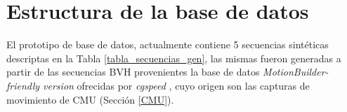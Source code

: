 \section{Estructura de la base de datos}

El prototipo de base de datos, actualmente contiene 5 secuencias sintéticas descriptas en la Tabla \ref{tabla_secuencias_gen}, las mismas fueron generadas a partir de las secuencias BVH provenientes la 
base de datos \textit{MotionBuilder-friendly version} ofrecidas por \textit{cgspeed} \cite{cgspeed}, cuyo origen son las capturas de movimiento de CMU (Sección \ref{CMU}). 






